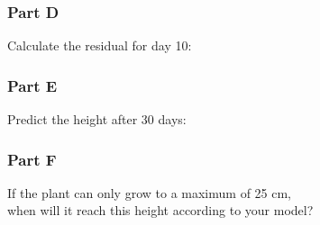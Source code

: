 \documentclass[12pt]{article}
\begin{document}
			\subsubsection*{Part D}
			
				Calculate the residual for day 10:

				\vspace{3cm}

			\subsubsection*{Part E}
			
				Predict the height after 30 days:

				\vspace{2cm}

			\subsubsection*{Part F}
			
				If the plant can only grow to a maximum of 25 cm,\\
				when will it reach this height according to your model?
\end{document}

